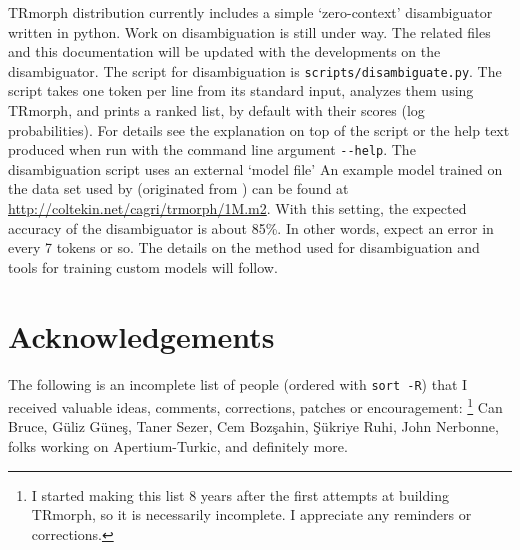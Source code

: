 \documentclass[twocolumn]{article}
\begin{document}
TRmorph distribution currently includes a simple `zero-context' disambiguator written in python.
Work on disambiguation is still under way. 
The related files and this  documentation will be updated with the developments on the disambiguator.
The script for disambiguation is \lstinline{scripts/disambiguate.py}.
The script takes one token per line from its standard input,
analyzes them using TRmorph,
and prints a ranked list, by default with their scores (log probabilities).
For details see the explanation on top of the script or
the help text produced when run with the command line argument \lstinline{--help}.
The disambiguation script uses an external `model file'
An example model trained on the data set used by \textcite{yuret2006} (originated from \textcite{hakkani-tur2002}) can be found at
\url{http://coltekin.net/cagri/trmorph/1M.m2}.
With this setting, the expected accuracy of the disambiguator is about 85\%.
In other words, expect an error in every 7 tokens or so.
The details on the method used for disambiguation and tools for training custom models will follow.


\section*{Acknowledgements}

The following is an incomplete list of people (ordered with \lstinline{sort -R}) 
that I received valuable ideas, comments, corrections, patches or encouragement:%
\footnote{I started making this list 8 years after the first attempts at building TRmorph, 
so it is necessarily incomplete. 
I appreciate any reminders or corrections.} 
Can Bruce, 
Güliz Güneş, 
Taner Sezer, 
Cem Bozşahin, 
Şükriye Ruhi, 
John Nerbonne, 
folks working on Apertium-Turkic,
and definitely more.

\printbibliography

\printindex
\end{document}

